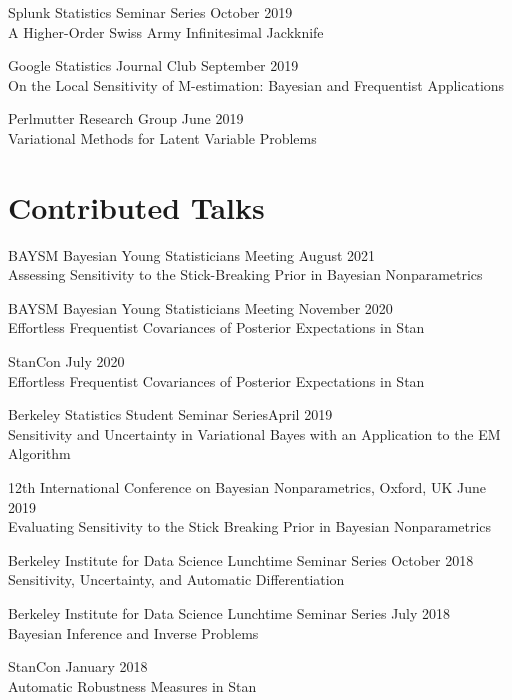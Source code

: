 Splunk Statistics Seminar Series \hfill October 2019\\
A Higher-Order Swiss Army Infinitesimal Jackknife

Google Statistics Journal Club \hfill September 2019\\
On the Local Sensitivity of M-estimation: Bayesian and Frequentist Applications

Perlmutter Research Group \hfill June 2019 \\
Variational Methods for Latent Variable Problems



\section{\sc Contributed Talks}

BAYSM Bayesian Young Statisticians Meeting
\hfill August 2021\\
Assessing Sensitivity to the Stick-Breaking Prior in Bayesian Nonparametrics

BAYSM Bayesian Young Statisticians Meeting
\hfill November 2020\\
Effortless Frequentist Covariances of Posterior Expectations in Stan

StanCon \hfill July 2020\\
Effortless Frequentist Covariances of Posterior Expectations in Stan

Berkeley Statistics Student Seminar Series\hfill April 2019\\
Sensitivity and Uncertainty in Variational Bayes with an Application to the
EM Algorithm

12th International Conference on Bayesian Nonparametrics, Oxford, UK
\hfill June 2019\\
Evaluating Sensitivity to the Stick Breaking Prior in Bayesian Nonparametrics

Berkeley Institute for Data Science Lunchtime Seminar Series \hfill October 2018\\
Sensitivity, Uncertainty, and Automatic Differentiation

Berkeley Institute for Data Science Lunchtime Seminar Series \hfill July 2018\\
Bayesian Inference and Inverse Problems

StanCon \hfill January 2018\\
Automatic Robustness Measures in Stan

